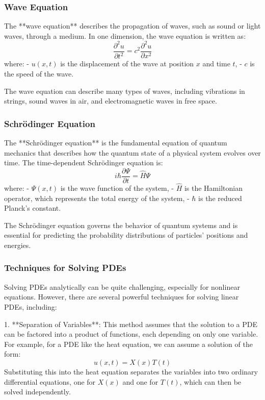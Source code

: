 \documentclass{article}
\begin{document}
\subsubsection*{Wave Equation}

The **wave equation** describes the propagation of waves, such as sound or light waves, through a medium. In one dimension, the wave equation is written as:
\[
\frac{\partial^2 u}{\partial t^2} = c^2 \frac{\partial^2 u}{\partial x^2}
\]
where:
- \( u(x, t) \) is the displacement of the wave at position \( x \) and time \( t \),
- \( c \) is the speed of the wave.

The wave equation can describe many types of waves, including vibrations in strings, sound waves in air, and electromagnetic waves in free space.

\subsubsection*{Schrödinger Equation}

The **Schrödinger equation** is the fundamental equation of quantum mechanics that describes how the quantum state of a physical system evolves over time. The time-dependent Schrödinger equation is:
\[
i \hbar \frac{\partial \Psi}{\partial t} = \hat{H} \Psi
\]
where:
- \( \Psi(x, t) \) is the wave function of the system,
- \( \hat{H} \) is the Hamiltonian operator, which represents the total energy of the system,
- \( \hbar \) is the reduced Planck’s constant.

The Schrödinger equation governs the behavior of quantum systems and is essential for predicting the probability distributions of particles' positions and energies.

\subsubsection*{Techniques for Solving PDEs}

Solving PDEs analytically can be quite challenging, especially for nonlinear equations. However, there are several powerful techniques for solving linear PDEs, including:

1. **Separation of Variables**:
   This method assumes that the solution to a PDE can be factored into a product of functions, each depending on only one variable. For example, for a PDE like the heat equation, we can assume a solution of the form:
   \[
   u(x, t) = X(x)T(t)
   \]
   Substituting this into the heat equation separates the variables into two ordinary differential equations, one for \( X(x) \) and one for \( T(t) \), which can then be solved independently.
\end{document}
